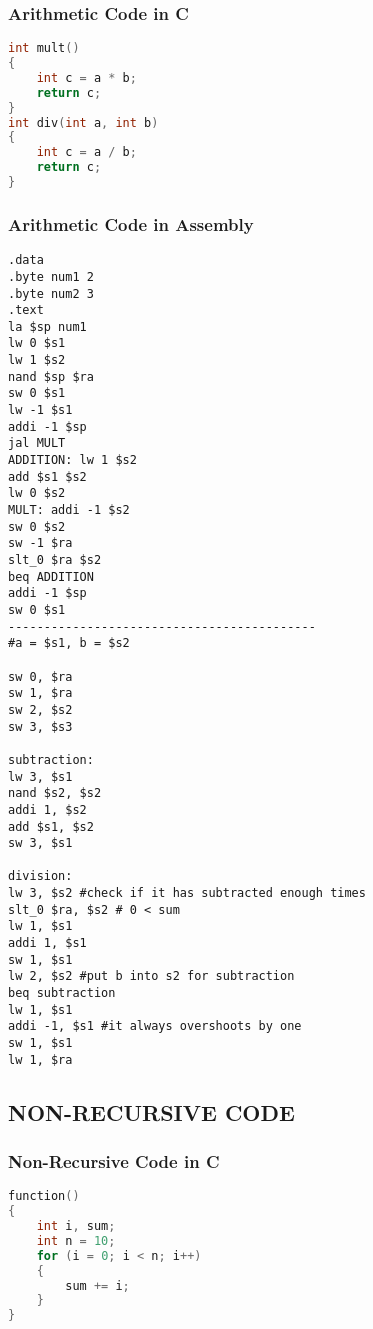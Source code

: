 \documentclass[11pt, titlepage]{article}
\begin{document}
\subsubsection{Arithmetic Code in C}
\begin{lstlisting}[language = C]
int mult()
{
	int c = a * b;
	return c;
}
int div(int a, int b)
{
	int c = a / b;
	return c;
}
\end{lstlisting}
\subsubsection{Arithmetic Code in Assembly}
\begin{lstlisting}[language=Ant]
.data 
.byte num1 2
.byte num2 3
.text
la $sp num1
lw 0 $s1
lw 1 $s2
nand $sp $ra
sw 0 $s1
lw -1 $s1
addi -1 $sp 
jal MULT
ADDITION: lw 1 $s2	
add $s1 $s2
lw 0 $s2
MULT: addi -1 $s2
sw 0 $s2
sw -1 $ra
slt_0 $ra $s2
beq ADDITION
addi -1 $sp
sw 0 $s1
-------------------------------------------
#a = $s1, b = $s2

sw 0, $ra
sw 1, $ra
sw 2, $s2
sw 3, $s3

subtraction:
lw 3, $s1
nand $s2, $s2
addi 1, $s2
add $s1, $s2
sw 3, $s1

division:
lw 3, $s2 #check if it has subtracted enough times
slt_0 $ra, $s2 # 0 < sum
lw 1, $s1
addi 1, $s1
sw 1, $s1
lw 2, $s2 #put b into s2 for subtraction
beq subtraction
lw 1, $s1
addi -1, $s1 #it always overshoots by one
sw 1, $s1
lw 1, $ra

\end{lstlisting}
\subsection{NON-RECURSIVE CODE}
\subsubsection{Non-Recursive Code in C}
\begin{lstlisting}[language = C]
function()
{
	int i, sum;
	int n = 10;
	for (i = 0; i < n; i++)
	{
		sum += i;
	}
}
\end{lstlisting}
\end{document}
